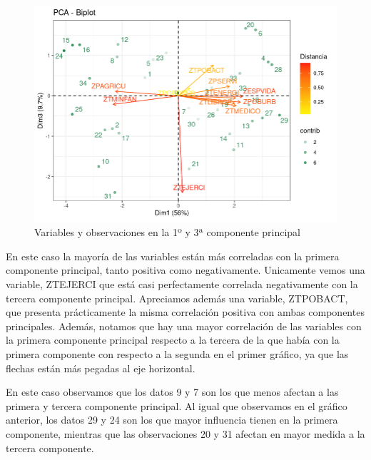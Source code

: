 \documentclass[11pt,a4paper]{article}
\begin{document}
    	
     \begin{figure}[H]
    	    \centering
    	    \includegraphics[scale=0.5]{pca5.png}
    	    \caption{Variables y observaciones en la 1º y 3ª componente principal}
    	    \label{pca5}
    	\end{figure}
    	
    
    
    	En este caso la mayoría de las variables están más correladas con la primera 
       componente principal, tanto positiva como negativamente. Unicamente vemos una 
    	variable, ZTEJERCI que está casi perfectamente correlada negativamente con la 
    	tercera componente principal. Apreciamos además una variable, ZTPOBACT, que    	
   	presenta prácticamente la misma correlación positiva con ambas componentes   	
    	principales. Además, notamos que hay una mayor correlación de las variables con la primera componente principal respecto a la tercera de la que había con la primera
    	componente con respecto a la segunda en el primer gráfico, ya que las flechas están más pegadas al eje horizontal.
    	

    	
    	En este caso observamos que los datos 9 y 7 son los que menos afectan a las primera y tercera componente principal. Al igual que observamos en el gráfico anterior, los datos 29 y 24 son los que mayor influencia tienen en la primera componente, mientras que las observaciones 20 y 31 afectan en mayor medida a la tercera componente.
    	
\end{document}
